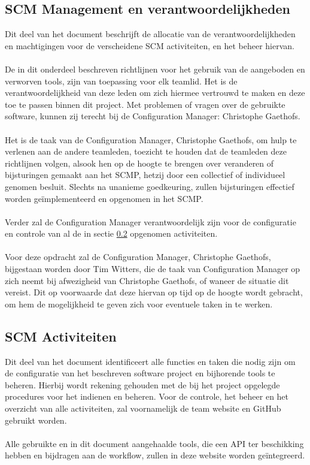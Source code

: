 \subsection{SCM Management en verantwoordelijkheden}
Dit deel van het document beschrijft de allocatie van de verantwoordelijkheden en machtigingen voor de verscheidene SCM activiteiten, en het beheer hiervan.
\\
\\
De in dit onderdeel beschreven richtlijnen voor het gebruik van de aangeboden en verworven tools, zijn van toepassing voor elk teamlid. Het is de verantwoordelijkheid van deze leden om zich hiermee vertrouwd te maken en deze toe te passen binnen dit project. Met problemen of vragen over de gebruikte software, kunnen zij terecht bij de Configuration Manager: Christophe Gaethofs.
\\
\\
Het is de taak van de Configuration Manager, Christophe Gaethofs, om hulp te verlenen aan de andere teamleden, toezicht te houden dat de teamleden deze richtlijnen volgen, alsook hen op de hoogte te brengen over veranderen of bijsturingen gemaakt aan het SCMP, hetzij door een collectief of individueel genomen besluit. Slechts na unanieme goedkeuring, zullen bijsturingen effectief worden geïmplementeerd en opgenomen in het SCMP.
\\
\\
Verder zal de Configuration Manager verantwoordelijk zijn voor de configuratie en controle van al de in sectie \ref{sec:SCMActiviteiten} opgenomen activiteiten.
\\
\\
Voor deze opdracht zal de Configuration Manager, Christophe Gaethofs, bijgestaan worden door Tim Witters, die de taak van Configuration Manager op zich neemt bij afwezigheid van Christophe Gaethofs, of waneer de situatie dit vereist. Dit op voorwaarde dat deze hiervan op tijd op de hoogte wordt gebracht, om hem de mogelijkheid te geven zich voor eventuele taken in te werken.

\subsection{SCM Activiteiten} \label{sec:SCMActiviteiten}
Dit deel van het document identificeert alle functies en taken die nodig zijn om de configuratie van het beschreven software project en bijhorende tools te beheren. Hierbij wordt rekening gehouden met de bij het project opgelegde procedures voor het indienen en beheren. Voor de controle, het beheer en het overzicht van alle activiteiten, zal voornamelijk de team website \cite{portalWebsite} en GitHub gebruikt worden.
\\
\\
Alle gebruikte en in dit document aangehaalde tools, die een API ter beschikking hebben en bijdragen aan de workflow, zullen in deze website worden geïntegreerd.

